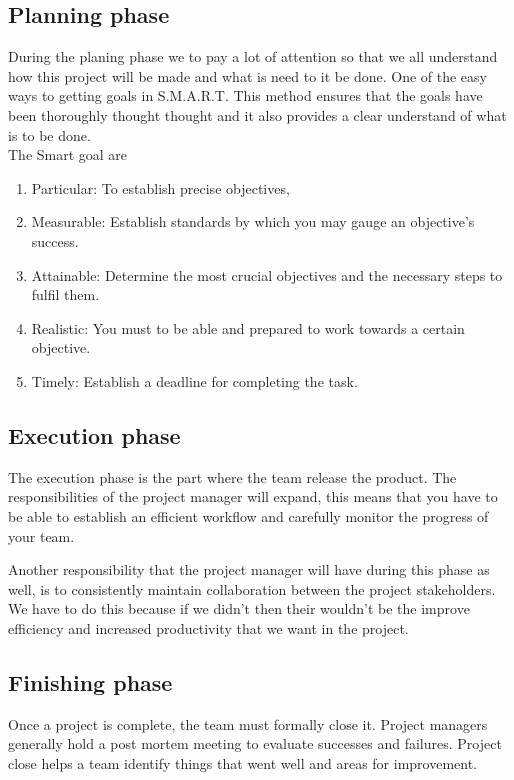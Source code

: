 \documentclass{article}
\begin{document}
\subsection{Planning phase}
During the planing phase we to pay a lot of attention so that we all understand how this project will be made and what is need to it be done. One of the easy ways to getting goals in S.M.A.R.T. This method ensures that the goals have been thoroughly thought thought and it also provides a clear understand of what is to be done. \\

The Smart goal are
\begin{enumerate}
    \item Particular: To establish precise objectives,
    \item Measurable: Establish standards by which you may gauge an objective's success.
    \item Attainable: Determine the most crucial objectives and the necessary steps to fulfil them.
    \item Realistic: You must to be able and prepared to work towards a certain objective.
    \item Timely: Establish a deadline for completing the task.
\end{enumerate}


\subsection{Execution phase}
The execution phase is the part where the team release the product. The responsibilities of the project manager will expand, this means that you have to be able to establish an efficient workflow and carefully monitor the progress of your team. 

Another responsibility that the project manager will have during this phase as well, is to consistently maintain collaboration between the project stakeholders. We have to do this because if we didn't then their wouldn't be the improve efficiency and increased productivity that we want in the project.

\subsection{Finishing phase}

Once a project is complete, the team must formally close it. Project managers generally hold a post mortem meeting to evaluate successes and failures. Project close helps a team identify things that went well and areas for improvement.
\end{document}
